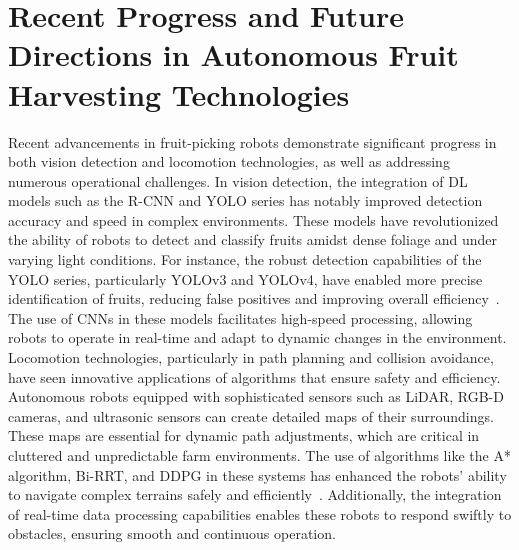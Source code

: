 \documentclass[a4paper,fleqn]{cas-dc}
\begin{document}
\section{Recent Progress and Future Directions in Autonomous Fruit Harvesting Technologies}

Recent advancements in fruit-picking robots demonstrate significant progress in both vision detection and locomotion technologies, as well as addressing numerous operational challenges. In vision detection, the integration of DL models such as the R-CNN and YOLO series has notably improved detection accuracy and speed in complex environments. These models have revolutionized the ability of robots to detect and classify fruits amidst dense foliage and under varying light conditions. For instance, the robust detection capabilities of the YOLO series, particularly YOLOv3 and YOLOv4, have enabled more precise identification of fruits, reducing false positives and improving overall efficiency~\cite{mehta2016robust, kirk2020b}. The use of CNNs in these models facilitates high-speed processing, allowing robots to operate in real-time and adapt to dynamic changes in the environment.
Locomotion technologies, particularly in path planning and collision avoidance, have seen innovative applications of algorithms that ensure safety and efficiency. Autonomous robots equipped with sophisticated sensors such as LiDAR, RGB-D cameras, and ultrasonic sensors can create detailed maps of their surroundings. These maps are essential for dynamic path adjustments, which are critical in cluttered and unpredictable farm environments. The use of algorithms like the A* algorithm, Bi-RRT, and DDPG in these systems has enhanced the robots' ability to navigate complex terrains safely and efficiently~\cite{yaguchi2016development, williams2020improvements}. Additionally, the integration of real-time data processing capabilities enables these robots to respond swiftly to obstacles, ensuring smooth and continuous operation.
\end{document}
